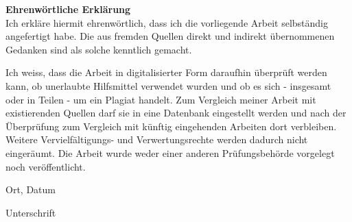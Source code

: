 \cleardoublepage
{}
\thispagestyle{empty}
\textbf{Ehrenw{\"o}rtliche Erkl{\"a}rung}\\

Ich erkl{\"a}re hiermit ehrenw{\"o}rtlich, dass ich die vorliegende Arbeit selbst{\"a}ndig angefertigt habe. Die aus fremden Quellen direkt und indirekt {\"u}bernommenen Gedanken sind als solche kenntlich gemacht.

Ich weiss, dass die Arbeit in digitalisierter Form daraufhin {\"u}berpr{\"u}ft werden kann, ob unerlaubte Hilfsmittel verwendet wurden und ob es sich - insgesamt oder in Teilen - um ein Plagiat handelt. Zum Vergleich meiner Arbeit mit existierenden Quellen darf sie in eine Datenbank eingestellt werden und nach der {\"U}berpr{\"u}fung zum Vergleich mit k{\"u}nftig eingehenden Arbeiten dort verbleiben. Weitere Verviel\-f{\"a}ltigungs- und Verwertungsrechte werden dadurch nicht einger{\"a}umt. Die Arbeit wurde weder einer anderen Pr{\"u}fungsbeh{\"o}rde vorgelegt noch ver{\"o}ffentlicht.


\vspace{2cm}
Ort, Datum
\vspace{2cm}

Unterschrift

